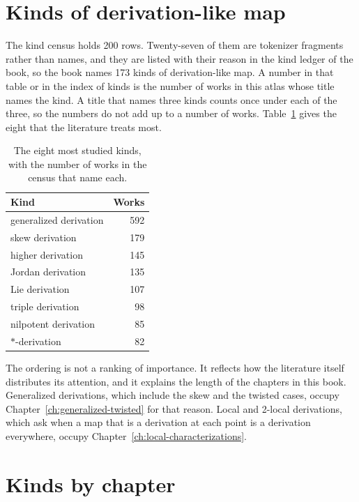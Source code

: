 \section{Kinds of derivation-like map}

The kind census holds 200 rows. Twenty-seven of them are tokenizer
fragments rather than names, and they are listed with their reason in the
kind ledger of the book, so the book names 173 kinds of derivation-like map.
A number in that table or in the index of kinds is the number of works in
this atlas whose title names the kind. A title that names three kinds counts
once under each of the three, so the numbers do not add up to a number of works.
Table~\ref{tab:atlas:kinds} gives the eight that the literature treats most.

\begin{table}[htbp]
  \centering
  \caption{The eight most studied kinds, with the number of works in the census
  that name each.}
  \label{tab:atlas:kinds}
  \begin{tabular}{lr}
    \toprule
    Kind & Works \\
    \midrule
    generalized derivation & 592 \\
    skew derivation        & 179 \\
    higher derivation      & 145 \\
    Jordan derivation      & 135 \\
    Lie derivation         & 107 \\
    triple derivation      & 98  \\
    nilpotent derivation   & 85  \\
    $*$-derivation         & 82  \\
    \bottomrule
  \end{tabular}
\end{table}

The ordering is not a ranking of importance.
It reflects how the literature itself distributes its attention, and it
explains the length of the chapters in this book.
Generalized derivations, which include the skew and the twisted cases, occupy
Chapter~\ref{ch:generalized-twisted} for that reason.
Local and 2-local derivations, which ask when a map that is a derivation at each
point is a derivation everywhere, occupy
Chapter~\ref{ch:local-characterizations}.

\section{Kinds by chapter}

